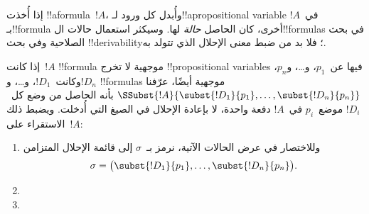 \documentclass[../../../include/open-logic-section]{subfiles}
\begin{document}


إذا أُخذت !!a{formula}~$!A$، وأُبدل كل ورود لـ!!a{propositional variable}
في~$!A$ بـ!!{formula} أخرى، كان الحاصل \emph{حالة} لها. وسيكثر
استعمال حالات ال!!{formula}s في بحث الصلاحية وفي بحث
!!{derivability}؛ فلا بد من ضبط معنى الإحلال الذي تتولد به.

\begin{defn}
  إذا كانت~$!A$ !!{formula} موجهية لا تخرج !!{propositional
    variable}s فيها عن~$p_1$، و\dots، و$p_n$، وكانت~$!D_1$، و\dots،
  و$!D_n$ !!{formula}s موجهية أيضًا، عرّفنا
  $\SSubst{!A}{\subst{!D_1}{p_1}, \dots, \subst{!D_n}{p_n}}$ بأنه
  الحاصل من وضع كل~$!D_i$ موضع~$p_i$ في~$!A$ دفعة واحدة،
  لا بإعادة الإحلال في الصيغ التي أُدخلت. ويضبط ذلك الاستقراء على~$!A$:
  \begin{enumerate}
    \item[] وللاختصار في عرض الحالات الآتية، نرمز بـ~$\sigma$ إلى قائمة
      الإحلال المتزامن
      \[
        \sigma =
        \bigl(\subst{!D_1}{p_1}, \dots, \subst{!D_n}{p_n}\bigr).
      \]
    \item {}
    \item {}
\end{enumerate}
\end{defn}
\end{document}
